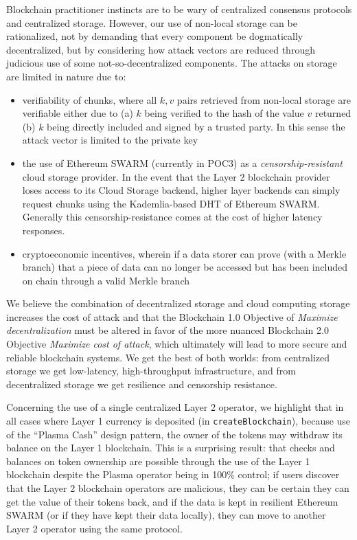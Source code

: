 \documentclass{article}
\begin{document}
Blockchain practitioner instincts are to be wary of centralized consensus protocols and centralized storage.  However, our use of non-local storage can be rationalized, not by demanding that every component be  dogmatically decentralized, but by considering how attack vectors are reduced through judicious use of some not-so-decentralized components.  The attacks on storage are limited in nature due to:
\begin{itemize}
\item verifiability of chunks, where all $k,v$ pairs retrieved from non-local storage are verifiable either due to (a) $k$ being verified to the hash of the value $v$ returned (b) $k$ being directly included and signed by a trusted party.  In this sense the attack vector is limited to the private key
\item the use of Ethereum SWARM (currently in POC3) as a {\em censorship-resistant} cloud storage provider.  In the event that the Layer 2 blockchain provider loses access to its Cloud Storage backend, higher layer backends can simply request chunks using the Kademlia-based DHT of Ethereum SWARM.  Generally this censorship-resistance comes at the cost of higher latency responses. 
\item cryptoeconomic incentives, wherein if a data storer can prove (with a Merkle branch) that a piece of data can no longer be accessed but has been included on chain through a valid Merkle branch
\end{itemize}
We believe the combination of decentralized storage and cloud computing storage increases the cost of attack and that the Blockchain 1.0 Objective of {\em Maximize decentralization} must be altered in favor of the more nuanced Blockchain 2.0 Objective {\em Maximize cost of attack}, which ultimately will lead to more secure and reliable blockchain systems.  We get the best of both worlds: from centralized storage we get low-latency, high-throughput infrastructure, and from decentralized storage we get resilience and censorship resistance.

Concerning the use of a single centralized Layer 2 operator, we highlight that in all cases where Layer 1 currency is deposited (in \texttt{createBlockchain}), because use of the ``Plasma Cash'' design pattern, the owner of the tokens may withdraw its balance on the Layer 1 blockchain.  This is a surprising result: that checks and balances on token ownership are possible through the use of the Layer 1 blockchain despite the Plasma operator being in 100\% control; if users discover that the Layer 2 blockchain operators are malicious, they can be certain they can get the value of their tokens back, and if the data is kept in resilient Ethereum SWARM (or if they have kept their data locally), they can move to another Layer 2 operator using  the same protocol.  
\end{document}
